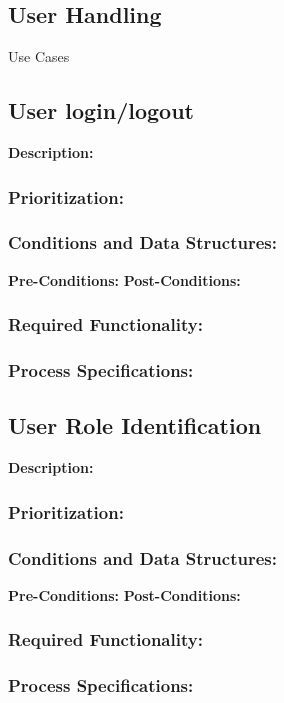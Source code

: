 
\newpage
\setlength{\voffset}{-3cm}

\begin{center}
\section{\textbf{\huge{User Handling}}}

\Large{Use Cases}
\end{center}


\subsection{User login/logout}
\textbf{Description:}
\subsubsection{Prioritization:}
\subsubsection{Conditions and Data Structures:}
\textbf{Pre-Conditions:}
\textbf{Post-Conditions:}	
\subsubsection{Required Functionality:} 
\subsubsection{Process Specifications:} 

\subsection{User Role Identification}
\textbf{Description:}
\subsubsection{Prioritization:}
\subsubsection{Conditions and Data Structures:}
\textbf{Pre-Conditions:}
\textbf{Post-Conditions:}	
\subsubsection{Required Functionality:} 
\subsubsection{Process Specifications:}

